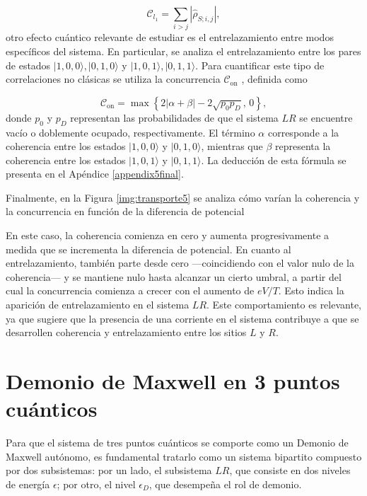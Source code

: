 \begin{equation*}
    \mathcal{C}_{l_{1}} = \sum_{i> j} |\hat{\rho}_{S;i,j}|,
\end{equation*}
otro efecto cuántico relevante de estudiar es el entrelazamiento entre modos específicos del sistema. En particular, se analiza el entrelazamiento entre los pares de estados \(|1,0,0\rangle, |0,1,0\rangle\) y \(|1,0,1\rangle, |0,1,1\rangle\). Para cuantificar este tipo de correlaciones no clásicas se utiliza la concurrencia \( \mathcal{C}_{\text{on}} \) \cite{hill1997entanglement, wootters1998entanglement}, definida como

\begin{equation*}
    \mathcal{C}_{\text{on}} = \max \left\{ 2|\alpha + \beta| - 2\sqrt{p_0 p_D},\, 0 \right\},
\end{equation*}
donde \( p_0 \) y \( p_D \) representan las probabilidades de que el sistema \( LR \) se encuentre vacío o doblemente ocupado, respectivamente. El término \( \alpha \) corresponde a la coherencia entre los estados \(|1,0,0\rangle\) y \(|0,1,0\rangle\), mientras que \( \beta \) representa la coherencia entre los estados \(|1,0,1\rangle\) y \(|0,1,1\rangle\). La deducción de esta fórmula se presenta en el Apéndice \ref{appendix5final}. 

Finalmente, en la Figura \ref{img:transporte5} se analiza cómo varían la coherencia y la concurrencia en función de la diferencia de potencial

    
En este caso, la coherencia comienza en cero y aumenta progresivamente a medida que se incrementa la diferencia de potencial. En cuanto al entrelazamiento, también parte desde cero —coincidiendo con el valor nulo de la coherencia— y se mantiene nulo hasta alcanzar un cierto umbral, a partir del cual la concurrencia comienza a crecer con el aumento de \( eV/T \). Esto indica la aparición de entrelazamiento en el sistema \( LR \). Este comportamiento es relevante, ya que sugiere que la presencia de una corriente en el sistema contribuye a que se desarrollen coherencia y entrelazamiento entre los sitios $L$ y $R$.  


\label{sec5:transporte}

\newpage

\section{Demonio de Maxwell en 3 puntos cuánticos}
Para que el sistema de tres puntos cuánticos se comporte como un Demonio de Maxwell autónomo, es fundamental tratarlo como un sistema bipartito compuesto por dos subsistemas: por un lado, el subsistema $LR$, que consiste en dos niveles de energía $\epsilon$; por otro, el nivel $\epsilon_D$, que desempeña el rol de demonio.


